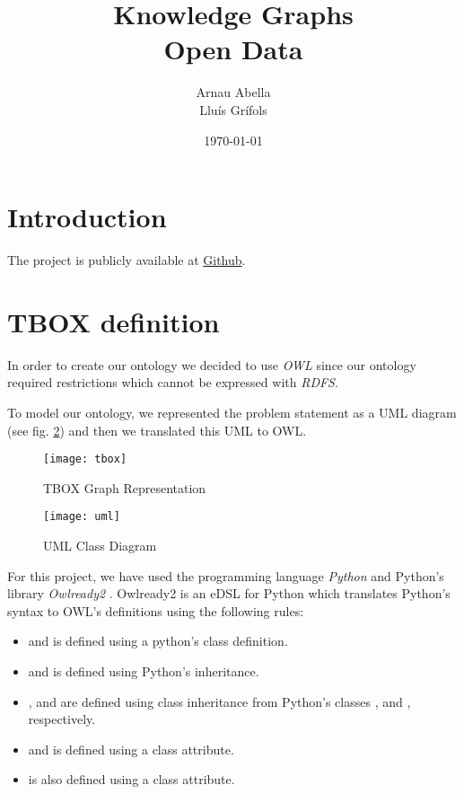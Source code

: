 \documentclass[12pt, a4paper]{article}
\title{%
  \vspace{-10ex}
  Knowledge Graphs \\
  \large{Open Data}}
\author{Arnau Abella\\Llu\'is Gr\'ifols}
\date{\today}
\begin{document}
\maketitle

\section{Introduction}\label{sec:introduction}

The project is publicly available at \href{https://github.com/monadplus/od-project-3}{Github}.

\section{TBOX definition}\label{sec:tbox}

In order to create our ontology we decided to use \textit{OWL} since our ontology required restrictions which cannot be expressed with \textit{RDFS}.

To model our ontology, we represented the problem statement as a UML diagram (see fig. \ref{fig:uml}) and then we translated this UML to OWL.

\begin{figure}[H]
  \centering
  \texttt{[image: tbox]}
  \caption{TBOX Graph Representation}
  \label{fig:tbox}
\end{figure}

\begin{figure}[H]
  \centering
  \texttt{[image: uml]}
  \caption{UML Class Diagram}
  \label{fig:uml}
\end{figure}

For this project, we have used the programming language \textit{Python} and Python's library \textit{Owlready2} \cite{Owlready2}. Owlready2 is an eDSL for Python which translates Python's syntax to OWL's definitions using the following rules:

\begin{itemize}
  \item {} and  is defined using a python's class definition.
  \item {} and  is defined using Python's inheritance.
  \item {},  and  are defined using class inheritance from Python's classes ,  and , respectively.
  \item {} and  is defined using a class attribute.
  \item {} is also defined using a class attribute.
\end{itemize}
\end{document}
